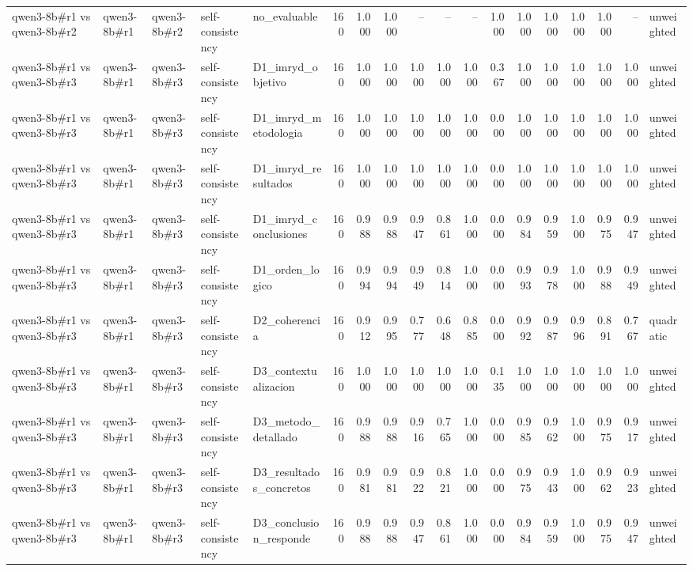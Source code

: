 \begin{table}
{\begin{tabular}{lllllrrrrrrrrrrrrl}
qwen3-8b\#r1 vs qwen3-8b\#r2 & qwen3-8b\#r1 & qwen3-8b\#r2 & self-consistency & no\_evaluable & 160 & 1.000 & 1.000 & -- & -- & -- & 1.000 & 1.000 & 1.000 & 1.000 & 1.000 & -- & unweighted \\
qwen3-8b\#r1 vs qwen3-8b\#r3 & qwen3-8b\#r1 & qwen3-8b\#r3 & self-consistency & D1\_imryd\_objetivo & 160 & 1.000 & 1.000 & 1.000 & 1.000 & 1.000 & 0.367 & 1.000 & 1.000 & 1.000 & 1.000 & 1.000 & unweighted \\
qwen3-8b\#r1 vs qwen3-8b\#r3 & qwen3-8b\#r1 & qwen3-8b\#r3 & self-consistency & D1\_imryd\_metodologia & 160 & 1.000 & 1.000 & 1.000 & 1.000 & 1.000 & 0.000 & 1.000 & 1.000 & 1.000 & 1.000 & 1.000 & unweighted \\
qwen3-8b\#r1 vs qwen3-8b\#r3 & qwen3-8b\#r1 & qwen3-8b\#r3 & self-consistency & D1\_imryd\_resultados & 160 & 1.000 & 1.000 & 1.000 & 1.000 & 1.000 & 0.000 & 1.000 & 1.000 & 1.000 & 1.000 & 1.000 & unweighted \\
qwen3-8b\#r1 vs qwen3-8b\#r3 & qwen3-8b\#r1 & qwen3-8b\#r3 & self-consistency & D1\_imryd\_conclusiones & 160 & 0.988 & 0.988 & 0.947 & 0.861 & 1.000 & 0.000 & 0.984 & 0.959 & 1.000 & 0.975 & 0.947 & unweighted \\
qwen3-8b\#r1 vs qwen3-8b\#r3 & qwen3-8b\#r1 & qwen3-8b\#r3 & self-consistency & D1\_orden\_logico & 160 & 0.994 & 0.994 & 0.949 & 0.814 & 1.000 & 0.000 & 0.993 & 0.978 & 1.000 & 0.988 & 0.949 & unweighted \\
qwen3-8b\#r1 vs qwen3-8b\#r3 & qwen3-8b\#r1 & qwen3-8b\#r3 & self-consistency & D2\_coherencia & 160 & 0.912 & 0.995 & 0.777 & 0.648 & 0.885 & 0.000 & 0.992 & 0.987 & 0.996 & 0.891 & 0.767 & quadratic \\
qwen3-8b\#r1 vs qwen3-8b\#r3 & qwen3-8b\#r1 & qwen3-8b\#r3 & self-consistency & D3\_contextualizacion & 160 & 1.000 & 1.000 & 1.000 & 1.000 & 1.000 & 0.135 & 1.000 & 1.000 & 1.000 & 1.000 & 1.000 & unweighted \\
qwen3-8b\#r1 vs qwen3-8b\#r3 & qwen3-8b\#r1 & qwen3-8b\#r3 & self-consistency & D3\_metodo\_detallado & 160 & 0.988 & 0.988 & 0.916 & 0.765 & 1.000 & 0.000 & 0.985 & 0.962 & 1.000 & 0.975 & 0.917 & unweighted \\
qwen3-8b\#r1 vs qwen3-8b\#r3 & qwen3-8b\#r1 & qwen3-8b\#r3 & self-consistency & D3\_resultados\_concretos & 160 & 0.981 & 0.981 & 0.922 & 0.821 & 1.000 & 0.000 & 0.975 & 0.943 & 1.000 & 0.962 & 0.923 & unweighted \\
qwen3-8b\#r1 vs qwen3-8b\#r3 & qwen3-8b\#r1 & qwen3-8b\#r3 & self-consistency & D3\_conclusion\_responde & 160 & 0.988 & 0.988 & 0.947 & 0.861 & 1.000 & 0.000 & 0.984 & 0.959 & 1.000 & 0.975 & 0.947 & unweighted \\

\end{tabular}}
\end{table}
